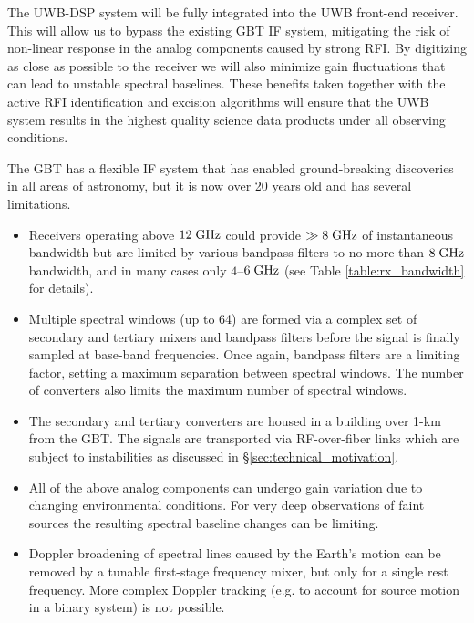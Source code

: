 \documentclass[10pt]{myNSF}
\begin{document}

The UWB-DSP system will be fully integrated into the UWB front-end
receiver.  This will allow us to bypass the existing GBT IF system,
mitigating the risk of non-linear response in the analog components
caused by strong RFI.  By digitizing as close as possible to the
receiver we will also minimize gain fluctuations that can lead to
unstable spectral baselines.  These benefits taken together with the
active RFI identification and excision algorithms will ensure that the
UWB system results in the highest quality science data products under
all observing conditions.


The GBT has a flexible IF system that has enabled ground-breaking
discoveries in all areas of astronomy, but it is now over 20 years old
and has several limitations.
\begin{itemize}
\item{Receivers operating above $12\; \textrm{GHz}$ could provide $\gg 8\;
    \textrm{GHz}$ of instantaneous bandwidth but are limited by various
    bandpass filters to no more than $8\; \textrm{GHz}$ bandwidth, and in many
    cases only $4$--$6\; \textrm{GHz}$ (see Table \ref{table:rx_bandwidth} for
    details).}
\item{Multiple spectral windows (up to 64) are formed via a complex
    set of secondary and tertiary mixers and bandpass filters before
    the signal is finally sampled at base-band frequencies.  Once
    again, bandpass filters are a limiting factor, setting a maximum
    separation between spectral windows.  The number of converters
    also limits the maximum number of spectral windows.}
\item{The secondary and tertiary converters are housed in a building
    over 1-km from the GBT.  The signals are transported via
    RF-over-fiber links which are subject to instabilities as
    discussed in \S\ref{sec:technical_motivation}.}
\item{All of the above analog components can undergo gain variation
    due to changing environmental conditions.  For very deep
    observations of faint sources the resulting spectral baseline
    changes can be limiting.}
\item{Doppler broadening of spectral lines caused by the Earth's
    motion can be removed by a tunable first-stage frequency mixer,
    but only for a single rest frequency.  More complex Doppler
    tracking (e.g. to account for source motion in a binary system) is
    not possible.}
\end{itemize}
\end{document}
